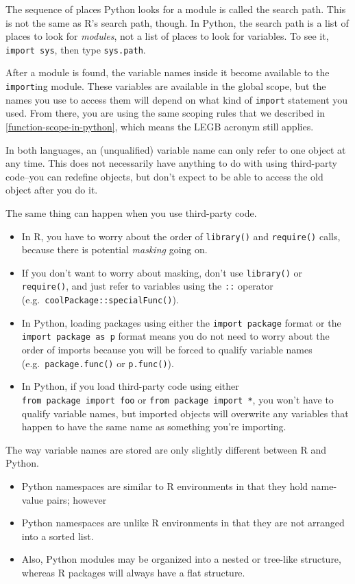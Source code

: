 \documentclass[
  12pt,
  krantz2]{krantz}
\providecommand{\tightlist}{%
  \setlength{\itemsep}{0pt}\setlength{\parskip}{0pt}}
\begin{document}
The sequence of places Python looks for a module is called the search path. This is not the same as R's search path, though. In Python, the search path is a list of places to look for \emph{modules}, not a list of places to look for variables. To see it, \texttt{import\ sys}, then type \texttt{sys.path}.

After a module is found, the variable names inside it become available to the \texttt{import}ing module. These variables are available in the global scope, but the names you use to access them will depend on what kind of \texttt{import} statement you used. From there, you are using the same scoping rules that we described in \ref{function-scope-in-python}, which means the LEGB acronym still applies.

In both languages, an (unqualified) variable name can only refer to one object at any time. This does not necessarily have anything to do with using third-party code--you can redefine objects, but don't expect to be able to access the old object after you do it.

The same thing can happen when you use third-party code.

\begin{itemize}
\tightlist
\item
  In R, you have to worry about the order of \texttt{library()} and \texttt{require()} calls, because there is potential \emph{masking} going on.
\item
  If you don't want to worry about masking, don't use \texttt{library()} or \texttt{require()}, and just refer to variables using the \texttt{::} operator (e.g.~\texttt{coolPackage::specialFunc()}).
\item
  In Python, loading packages using either the \texttt{import\ package} format or the \texttt{import\ package\ as\ p} format means you do not need to worry about the order of imports because you will be forced to qualify variable names (e.g.~\texttt{package.func()} or \texttt{p.func()}).
\item
  In Python, if you load third-party code using either \texttt{from\ package\ import\ foo} or \texttt{from\ package\ import\ *}, you won't have to qualify variable names, but imported objects will overwrite any variables that happen to have the same name as something you're importing.
\end{itemize}

The way variable names are stored are only slightly different between R and Python.

\begin{itemize}
\tightlist
\item
  Python namespaces are similar to R environments in that they hold name-value pairs; however
\item
  Python namespaces are unlike R environments in that they are not arranged into a sorted list.
\item
  Also, Python modules may be organized into a nested or tree-like structure, whereas R packages will always have a flat structure.
\end{itemize}
\end{document}
